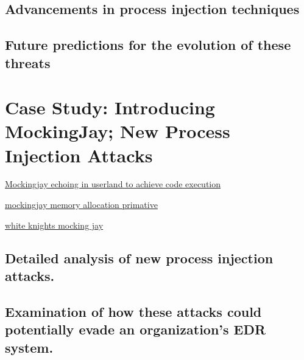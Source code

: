 \documentclass{article}
\begin{document}
\subsection{Advancements in process injection techniques}

\subsection{Future predictions for the evolution of these threats}



\pagebreak
\section{Case Study: Introducing MockingJay; New Process Injection Attacks}


\href{https://www.securityjoes.com/post/process-mockingjay-echoing-rwx-in-userland-to-achieve-code-execution}{Mockingjay echoing in userland to achieve code execution}

\href{https://www.linkedin.com/posts/john-stigerwalt-90a9b4110_mockingjay-memory-allocation-primitive-activity-7083050050158743552-Hgyw}{mockingjay memory allocation primative}

\href{https://whiteknightlabs.com/2023/07/06/mockingjay-memory-allocation-primitive/}{white knights mocking jay}


\subsection{Detailed analysis of new process injection attacks.}

\subsection{Examination of how these attacks could potentially evade an organization's EDR system.}

\end{document}
